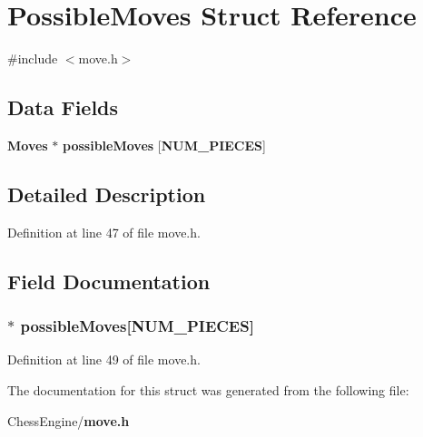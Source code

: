 \section{Possible\+Moves Struct Reference}
\label{struct_possible_moves}


{\ttfamily \#include $<$move.\+h$>$}

\subsection*{Data Fields}
\begin{DoxyCompactItemize}
\item 
{\bf Moves} $\ast$ {\bf possible\+Moves} [{\bf N\+U\+M\+\_\+\+P\+I\+E\+C\+E\+S}]
\end{DoxyCompactItemize}


\subsection{Detailed Description}


Definition at line 47 of file move.\+h.



\subsection{Field Documentation}
\subsubsection[{possible\+Moves}]{$\ast$ possible\+Moves[{\bf N\+U\+M\+\_\+\+P\+I\+E\+C\+E\+S}]}\label{struct_possible_moves_af336f7f974074ea9d0f13d2615786452}


Definition at line 49 of file move.\+h.



The documentation for this struct was generated from the following file\+:\begin{DoxyCompactItemize}
\item 
Chess\+Engine/{\bf move.\+h}\end{DoxyCompactItemize}
